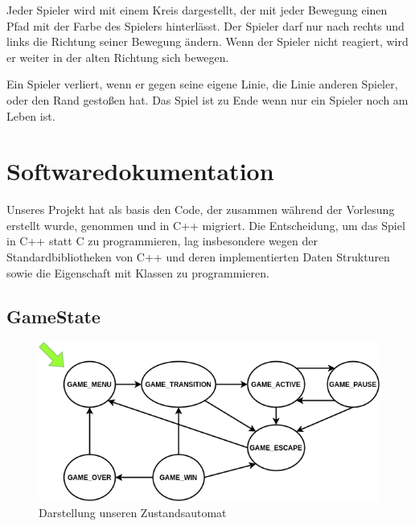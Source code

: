 \documentclass[doktyp=studarbeit]{TUBAFarbeiten}
\begin{document}
Jeder Spieler wird mit einem Kreis dargestellt, der mit jeder Bewegung einen 
Pfad mit der Farbe des Spielers hinterlässt. Der Spieler darf nur nach rechts 
und links die Richtung seiner Bewegung ändern. Wenn der Spieler nicht reagiert, 
wird er weiter in der alten Richtung sich bewegen.

Ein Spieler verliert, wenn er gegen seine eigene Linie, die Linie anderen 
Spieler,  oder den Rand gestoßen hat. Das Spiel ist zu Ende wenn nur ein 
Spieler noch am Leben ist.

\section{Softwaredokumentation}

Unseres Projekt hat als basis den Code, der zusammen während der Vorlesung 
erstellt wurde, genommen und in C++ migriert. 
Die Entscheidung, um das Spiel in C++ statt C zu programmieren, lag 
insbesondere wegen der Standardbibliotheken von C++ und deren implementierten 
Daten Strukturen sowie die Eigenschaft mit Klassen zu programmieren.

\subsection{GameState}

\begin{figure}
    \centering
    \includegraphics[width=0.7\linewidth]{state_machine.png}
	\caption{Darstellung unseren Zustandsautomat}
	\label{fig:state-machine}
\end{figure}


\printbibliography[heading=bibintoc]
\end{document}
